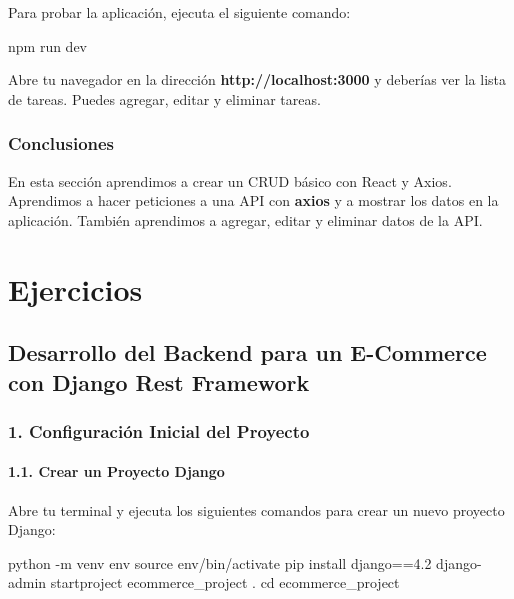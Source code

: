 \documentclass[
  a4paper,
  DIV=11,
  numbers=noendperiod,
  onepage,
  openany]{scrreprt}
\newenvironment{Shaded}{\begin{snugshade}}{\end{snugshade}}
\newcommand{\AttributeTok}[1]{\textcolor[rgb]{0.40,0.45,0.13}{#1}}
\newcommand{\BuiltInTok}[1]{\textcolor[rgb]{0.00,0.23,0.31}{#1}}
\newcommand{\ExtensionTok}[1]{\textcolor[rgb]{0.00,0.23,0.31}{#1}}
\newcommand{\NormalTok}[1]{\textcolor[rgb]{0.00,0.23,0.31}{#1}}
\begin{document}
\begin{tcolorbox}
Para probar la aplicación, ejecuta el siguiente comando:

\begin{Shaded}
\begin{Highlighting}[]
\ExtensionTok{npm}\NormalTok{ run dev}
\end{Highlighting}
\end{Shaded}

Abre tu navegador en la dirección \textbf{http://localhost:3000} y
deberías ver la lista de tareas. Puedes agregar, editar y eliminar
tareas.

\section{Conclusiones}\label{conclusiones-9}

En esta sección aprendimos a crear un CRUD básico con React y Axios.
Aprendimos a hacer peticiones a una API con \textbf{axios} y a mostrar
los datos en la aplicación. También aprendimos a agregar, editar y
eliminar datos de la API.

\part{Ejercicios}

\chapter{Desarrollo del Backend para un E-Commerce con Django Rest
Framework}\label{desarrollo-del-backend-para-un-e-commerce-con-django-rest-framework}

\section{1. Configuración Inicial del
Proyecto}\label{configuraciuxf3n-inicial-del-proyecto}

\subsection{1.1. Crear un Proyecto
Django}\label{crear-un-proyecto-django}

Abre tu terminal y ejecuta los siguientes comandos para crear un nuevo
proyecto Django:

\begin{Shaded}
\begin{Highlighting}[]
\ExtensionTok{python} \AttributeTok{{-}m}\NormalTok{ venv env}
\BuiltInTok{source}\NormalTok{ env/bin/activate}
\ExtensionTok{pip}\NormalTok{ install django==4.2}
\ExtensionTok{django{-}admin}\NormalTok{ startproject ecommerce\_project .}
\BuiltInTok{cd}\NormalTok{ ecommerce\_project}
\end{Highlighting}
\end{Shaded}


\end{tcolorbox}
\end{document}
